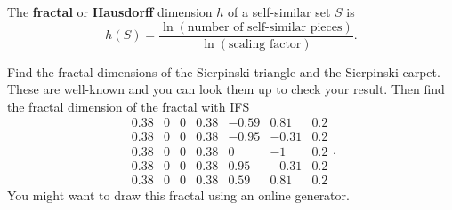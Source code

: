 \begin{definition} The \textbf{fractal} or \textbf{Hausdorff} dimension $h$ of a self-similar set $S$ is 
\[h(S) = \frac{\ln(\text{number of self-similar pieces})}{\ln(\text{scaling factor})}.\]
\end{definition}

\begin{pactivity} \label{act:IFS_dimension} Find the fractal dimensions of the Sierpinski triangle and the Sierpinski carpet. These are well-known and you can look them up to check your result. Then find the fractal dimension of the fractal with IFS
\[\begin{array}{ccccccc}
0.38 &0 &0 &0.38 &-0.59 	&0.81	&0.2 \\
0.38 &0 &0 &0.38 &-0.95 	&-0.31 	&0.2 \\
0.38 &0 &0 &0.38 &0 	&-1 		&0.2 \\
0.38 &0 &0 &0.38 &0.95 	&-0.31 	&0.2 \\
0.38 &0 &0 &0.38 &0.59 	&0.81 	&0.2
\end{array}.\]
You might want to draw this fractal using an online generator. 


\end{pactivity}


